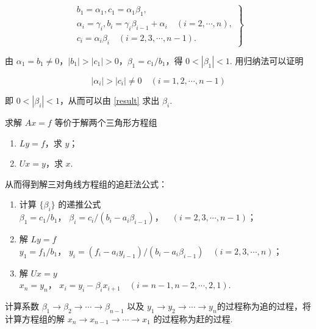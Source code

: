 \begin{equation}
    \left.\begin{matrix}
        b_1 = \alpha_1, c_1 = \alpha_1\beta_1,                                            \\
        \alpha_i = \gamma_i, b_i = \gamma_i\beta_{i-1} + \alpha_i\quad(i = 2, \cdots, n), \\
        c_i = \alpha_i\beta_i\quad(i=2,3,\cdots,n-1).
    \end{matrix}\right\}
    \label{result}
\end{equation}

由 $\alpha_1 = b_1 \neq 0$，$\left|b_1\right| > \left|c_1\right| > 0$，$\beta_1 = c_1 / b_1$，得 $0 < \left|\beta_1\right| < 1$. 用归纳法可以证明

\[ \left|\alpha_i\right| > \left|c_i\right| \neq 0\quad(i=1,2, \cdots, n - 1)\]

即 $0 < \left|\beta_i\right| < 1$，从而可以由 \eqref{result} 求出 $\beta_i$.

求解 $Ax=f$ 等价于解两个三角形方程组

\begin{enumerate}
    \item $Ly=f$，求 $y$；
    \item $Ux=y$，求 $x$.
\end{enumerate}

从而得到解三对角线方程组的追赶法公式：

\begin{enumerate}
    \item 计算 $\{\beta_i\}$ 的递推公式 \\
          $\beta_1 = c_1 / b_1$，
          $\beta_i = c_i / (b_i - a_i\beta_{i-1})$，$\quad(i=2,3,\cdots,n-1)$；
    \item 解 $Ly = f$ \\
          $y_1 = f_1 / b_1$，
          $y_i = (f_i - a_iy_{i-1}) / (b_i - a_i\beta_{i-1})\quad(i=2,3,\cdots,n)$；
    \item 解 $Ux = y$ \\
          $x_n = y_n$，
          $x_i = y_i - \beta_ix_{i+1}\quad(i=n-1,n-2,\cdots,2,1)$.
\end{enumerate}

计算系数 $\beta_1 \rightarrow \beta_2 \rightarrow \cdots \rightarrow \beta_{n-1}$ 以及 $y_1 \rightarrow y_2 \rightarrow \cdots \rightarrow y_n$的过程称为追的过程，将计算方程组的解 $x_n \rightarrow x_{n-1} \rightarrow \cdots \rightarrow x_1$ 的过程称为赶的过程.
